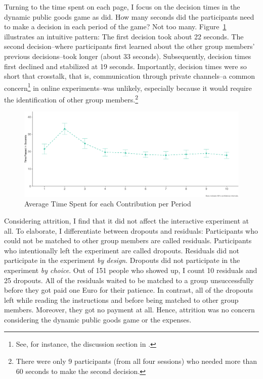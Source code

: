 \documentclass[
  authoryear,
  preprint,
  3p]{elsarticle}
\begin{document}
Turning to the time spent on each page, I focus on the decision times in
the dynamic public goods game as \citet{Anderhub2001} did. How many
seconds did the participants need to make a decision in each period of
the game? Not too many. Figure~\ref{fig-time-spent} illustrates an
intuitive pattern: The first decision took about 22 seconds. The second
decision--where participants first learned about the other group
members' previous decisions--took longer (about 33 seconds).
Subsequently, decision times first declined and stabilized at 19
seconds. Importantly, decision times were so short that crosstalk, that
is, communication through private channels--a common concern\footnote{See,
  for instance, the discussion section in \citet[p.~119]{AGM2018}.} in
online experiments--was unlikely, especially because it would require
the identification of other group members.\footnote{There were only 9
  participants (from all four sessions) who needed more than 60 seconds
  to make the second decision.}

\begin{figure}

{\centering \includegraphics{paper_files/figure-pdf/fig-time-spent-1.pdf}

}

\caption{\label{fig-time-spent}Average Time Spent for each Contribution
per Period}

\end{figure}

Considering attrition, I find that it did not affect the interactive
experiment at all. To elaborate, I differentiate between dropouts and
residuals: Participants who could not be matched to other group members
are called residuals. Participants who intentionally left the experiment
are called dropouts. Residuals did not participate in the experiment
\emph{by design}. Dropouts did not participate in the experiment
\emph{by choice}. Out of 151 people who showed up, I count 10 residuals
and 25 dropouts. All of the residuals waited to be matched to a group
unsuccessfully before they got paid one Euro for their patience. In
contrast, all of the dropouts left while reading the instructions and
before being matched to other group members. Moreover, they got no
payment at all. Hence, attrition was no concern considering the dynamic
public goods game or the expenses.
\end{document}
